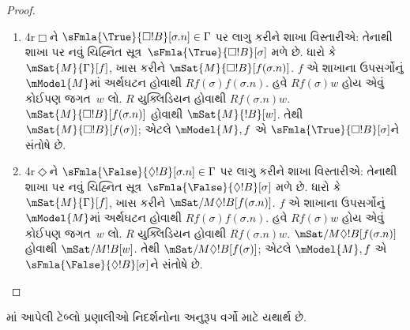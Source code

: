 \begin{proof}
\begin{enumerate}
\item 4r$\Box$ને
  $\sFmla{\True}{\Box !B}[\sigma.n] \in \Gamma$ પર લાગુ કરીને
  શાખા વિસ્તારીએ:
  તેનાથી શાખા પર નવું ચિહ્નિત સૂત્ર~$\sFmla{\True}{\Box!B}[\sigma]$ મળે છે. ધારો કે
    $\mSat{M}{\Gamma}[f]$, ખાસ કરીને $\mSat{M}{\Box
      !B}[f(\sigma.n)]$. $f$ એ શાખાના ઉપસર્ગોનું
    $\mModel{M}$માં અર્થઘટન હોવાથી $Rf(\sigma)f(\sigma.n)$.
    હવે $Rf(\sigma)w$ હોય એવું કોઈપણ જગત~$w$ લો.
    $R$ યુક્લિડિયન હોવાથી $Rf(\sigma.n)w$.
    $\mSat{M}{\Box !B}[f(\sigma.n)]$ હોવાથી
    $\mSat{M}{!B}[w]$. તેથી $\mSat{M}{\Box !B}[f(\sigma)]$;
    એટલે $\mModel{M}, f$ એ
    $\sFmla{\True}{\Box !B}[\sigma]$ને સંતોષે છે.
\item 4r$\Diamond$ને
  $\sFmla{\False}{\Diamond !B}[\sigma.n] \in \Gamma$ પર લાગુ
  કરીને શાખા વિસ્તારીએ:
  તેનાથી શાખા પર નવું ચિહ્નિત સૂત્ર~$\sFmla{\False}{\Diamond!B}[\sigma]$ મળે છે.
    ધારો કે $\mSat{M}{\Gamma}[f]$, ખાસ કરીને
    $\mSat/{M}{\Diamond !B}[f(\sigma.n)]$.
    $f$ એ શાખાના ઉપસર્ગોનું $\mModel{M}$માં અર્થઘટન હોવાથી
    $Rf(\sigma)f(\sigma.n)$. હવે $Rf(\sigma)w$ હોય એવું
    કોઈપણ જગત~$w$ લો. $R$ યુક્લિડિયન હોવાથી
    $Rf(\sigma.n)w$. $\mSat/{M}{\Diamond !B}[f(\sigma.n)]$
    હોવાથી $\mSat/{M}{!B}[w]$. તેથી
    $\mSat/{M}{\Diamond !B}[f(\sigma)]$; એટલે
    $\mModel{M}, f$ એ
    $\sFmla{\False}{\Diamond !B}[\sigma]$ને સંતોષે છે.
\end{enumerate}
\end{proof}



\begin{cor}
 માં
આપેલી ટેબ્લો પ્રણાલીઓ નિદર્શનોના અનુરૂપ વર્ગો માટે
યથાર્થ છે.
\end{cor}
\endgroup

\begingroup
\makeatletter{}\makeatother


\label{guunit:OLP-0467}


